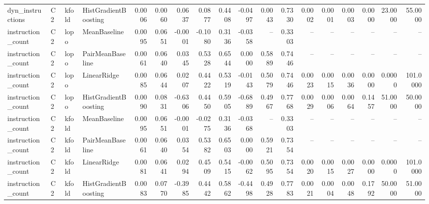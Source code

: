 \begin{table}[t]
\begin{tabular}{llllrrrrrrrrrrrrrr}
dyn\_instructions & C2 & kfold & HistGradientBoosting & 0.0006 & 0.0060 & 0.0637 & 0.0877 & 0.4408 & -0.0497 & 0.0043 & 0.7330 & 0.0002 & 0.0001 & 0.0003 & 0.0000 & 23.0000 & 55.0000 \\
instruction\_count & C2 & lopo & MeanBaseline & 0.0095 & 0.0651 & -0.0001 & -0.1080 & 0.3136 & -0.0358 & -- & 0.3303 & -- & -- & -- & -- & -- & -- \\
instruction\_count & C2 & lopo & PairMeanBaseline & 0.0061 & 0.0640 & 0.0345 & 0.5328 & 0.6544 & 0.0000 & 0.5889 & 0.7446 & -- & -- & -- & -- & -- & -- \\
instruction\_count & C2 & lopo & LinearRidge & 0.0085 & 0.0644 & 0.0207 & 0.4422 & 0.5319 & -0.0143 & 0.5079 & 0.7446 & 0.0023 & 0.0015 & 0.0036 & 0.0000 & 0.0000 & 101.0000 \\
instruction\_count & C2 & lopo & HistGradientBoosting & 0.0090 & 0.0831 & -0.6306 & 0.4450 & 0.5905 & -0.6889 & 0.4967 & 0.7768 & 0.0029 & 0.0006 & 0.0064 & 0.1457 & 51.0000 & 50.0000 \\
instruction\_count & C2 & kfold & MeanBaseline & 0.0095 & 0.0651 & -0.0001 & -0.0275 & 0.3136 & -0.0368 & -- & 0.3303 & -- & -- & -- & -- & -- & -- \\
instruction\_count & C2 & kfold & PairMeanBaseline & 0.0061 & 0.0640 & 0.0354 & 0.5382 & 0.6503 & 0.0000 & 0.5921 & 0.7354 & -- & -- & -- & -- & -- & -- \\
instruction\_count & C2 & kfold & LinearRidge & 0.0081 & 0.0641 & 0.0294 & 0.4509 & 0.5415 & -0.0062 & 0.5095 & 0.7354 & 0.0020 & 0.0015 & 0.0027 & 0.0000 & 0.0000 & 101.0000 \\
instruction\_count & C2 & kfold & HistGradientBoosting & 0.0083 & 0.0770 & -0.3985 & 0.4442 & 0.5862 & -0.4498 & 0.4928 & 0.7783 & 0.0021 & 0.0004 & 0.0048 & 0.1792 & 50.0000 & 51.0000 \\
\bottomrule
\end{tabular}
\end{table}
